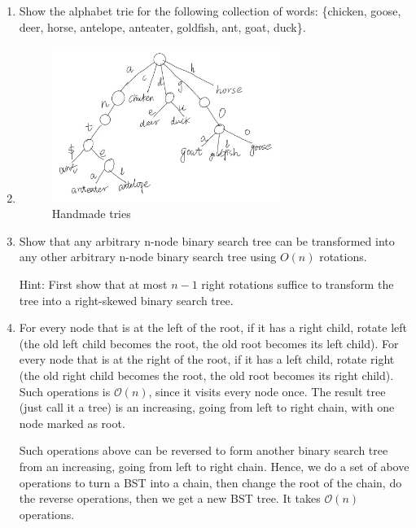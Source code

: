 \documentclass[12pt,a4paper]{article}
\makeatletter
\newtheorem*{solution}{Solution}
\theoremstyle{definition}
\renewenvironment{solution}[1][Solution] {\par\pushQED{\qed}\normalfont\topsep6\p@\@plus6\p@\relax\trivlist\item[\hskip\labelsep\bfseries#1\@addpunct{.}]\ignorespaces}{\popQED\endtrivlist\@endpefalse} \makeatother
\makeatother
\begin{document}
\begin{enumerate}
\item  Show the alphabet trie for the following collection of words: \{chicken, goose, deer, horse, antelope, anteater, goldfish, ant, goat, duck\}.

\begin{solution} 
\begin{figure}[h]
    \centering
    \includegraphics[width=0.7\textwidth]{1.jpg}
    \caption{Handmade tries}
    \label{tries}
\end{figure}
\end{solution}

\newpage
\item  Show that any arbitrary n-node binary search tree can be transformed into any other arbitrary n-node binary search tree using $O(n)$ rotations. 

	{\color{blue} Hint: First show that at most $n − 1$ right rotations suffice to transform the tree into a right-skewed binary
search tree.}

\begin{solution} 

    \par For every node that is at the left of the root, if it has a right child, rotate left (the old left child becomes the root, the old root becomes its left child). For every node that is at the right of the root, if it has a left child, rotate right (the old right child becomes the root, the old root becomes its right child). Such operations is $\mathcal{O}(n)$, since it visits every node once. The result tree (just call it a tree) is an increasing, going from left to right chain, with one node marked as root.
    \par Such operations above can be reversed to form another binary search tree from an increasing, going from left to right chain. Hence, we do a set of above operations to turn a BST into a chain, then change the root of the chain, do the reverse operations, then we get a new BST tree. It takes $\mathcal{O}(n)$ operations. 
\end{solution}


\end{enumerate}
\end{document}

